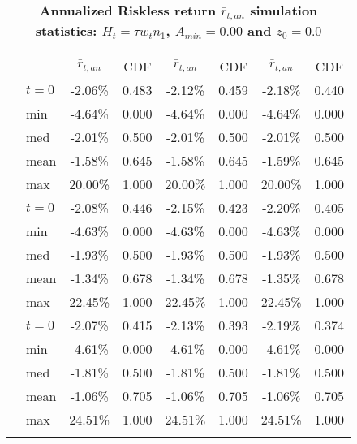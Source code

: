 \documentclass[letterpaper,12pt]{article}
\theoremstyle{definition}
\begin{document}
\begin{spacing}{1.5}
  \begin{table}[htbp]\centering\captionsetup{width=4.6in}
  \caption{\label{TabRiskl_tA0}\textbf{Annualized Riskless return $\bar{r}_{t,an}$ simulation statistics: $H_t = \tau w_t n_1$, $A_{min}=0.00$ and $z_0=0.0$}}
    \begin{threeparttable}
    \begin{tabular}{>{\small}c >{\small}l| >{\small}c >{\small}c| >{\small}c >{\small}c| >{\small}c >{\small}c}
      \hline\hline
      & & \multicolumn{2}{c}{$k_{2,0}=0.11$} & \multicolumn{2}{c}{$k_{2,0}=0.14$} & \multicolumn{2}{c}{$k_{2,0}=0.17$} \\ \cline{3-8}
      & & $\bar{r}_{t,an}$ & CDF & $\bar{r}_{t,an}$ & CDF & $\bar{r}_{t,an}$ & CDF \\
      \hline
      \multirow{5}{*}{$\tau=0.00$}
      & $t=0$ & -2.06\% & 0.483 & -2.12\% & 0.459 & -2.18\% & 0.440 \\
      & min & -4.64\% & 0.000 & -4.64\% & 0.000 & -4.64\% & 0.000 \\
      & med & -2.01\% & 0.500 & -2.01\% & 0.500 & -2.01\% & 0.500 \\
      & mean & -1.58\% & 0.645 & -1.58\% & 0.645 & -1.59\% & 0.645 \\
      & max & 20.00\% & 1.000 & 20.00\% & 1.000 & 20.00\% & 1.000 \\
      \hline
      \multirow{5}{*}{$\tau=0.11$}
      & $t=0$ & -2.08\% & 0.446 & -2.15\% & 0.423 & -2.20\% & 0.405 \\
      & min & -4.63\% & 0.000 & -4.63\% & 0.000 & -4.63\% & 0.000 \\
      & med & -1.93\% & 0.500 & -1.93\% & 0.500 & -1.93\% & 0.500 \\
      & mean & -1.34\% & 0.678 & -1.34\% & 0.678 & -1.35\% & 0.678 \\
      & max & 22.45\% & 1.000 & 22.45\% & 1.000 & 22.45\% & 1.000 \\
      \hline
      \multirow{5}{*}{$\tau=0.20$}
      & $t=0$ & -2.07\% & 0.415 & -2.13\% & 0.393 & -2.19\% & 0.374 \\
      & min & -4.61\% & 0.000 & -4.61\% & 0.000 & -4.61\% & 0.000 \\
      & med & -1.81\% & 0.500 & -1.81\% & 0.500 & -1.81\% & 0.500 \\
      & mean & -1.06\% & 0.705 & -1.06\% & 0.705 & -1.06\% & 0.705 \\
      & max & 24.51\% & 1.000 & 24.51\% & 1.000 & 24.51\% & 1.000 \\
      \hline
      \multirow{5}{*}{$\tau=0.25$}

\end{tabular}
\end{threeparttable}
\end{table}
\end{spacing}
\end{document}
